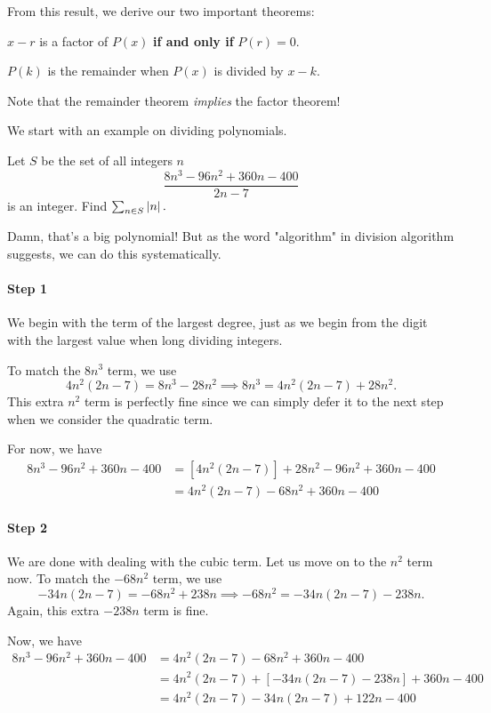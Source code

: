 \documentclass[../jarvis.tex]{subfiles}
\begin{document}
From this result, we derive our two important theorems:
\begin{theorem}
    $x-r$ is a factor of $P(x)$ \textbf{if and only if} $P(r)=0$.
\end{theorem}
\begin{theorem}
    $P(k)$ is the remainder when $P(x)$ is divided by $x-k$. 
\end{theorem}
\begin{remark}
    Note that the remainder theorem \textit{implies} the factor theorem!
\end{remark}

We start with an example on dividing polynomials.
\begin{example}[2011 SMO(O) P1]
    Let $S$ be the set of all integers $n$ $$\frac{8n^3-96n^2+360n-400}{2n-7}$$ is an integer. Find $\sum_{n\in S}\left\lvert n \right\rvert.$
\end{example}
Damn, that's a big polynomial! But as the word "algorithm" in division algorithm suggests, we can do this systematically. 

\paragraph{Step 1}We begin with the term of the largest degree, just as we begin from the digit with the largest value when long dividing integers.

To match the $8n^3$ term, we use $$4n^2(2n-7)=8n^3-28n^2\implies 8n^3=4n^2(2n-7)+28n^2.$$ This extra $n^2$ term is perfectly fine since we can simply defer it to the next step when we consider the quadratic term.

For now, we have 
\begin{align*}
    8n^3-96n^2+360n-400&=\left[4n^2(2n-7)\right]+28n^2-96n^2+360n-400 \\
    &=4n^2(2n-7)-68n^2+360n-400
\end{align*}

\paragraph{Step 2}We are done with dealing with the cubic term. Let us move on to the $n^2$ term now. To match the $-68n^2$ term, we use $$-34n(2n-7)=-68n^2+238n \implies -68n^2=-34n(2n-7)-238n.$$ Again, this extra $-238n$ term is fine.

Now, we have
\begin{align*}
    8n^3-96n^2+360n-400&=4n^2(2n-7)-68n^2+360n-400 \\
    &=4n^2(2n-7)+\left[-34n(2n-7)-238n\right]+360n-400\\
    &=4n^2(2n-7)-34n(2n-7)+122n-400
\end{align*}
\end{document}
